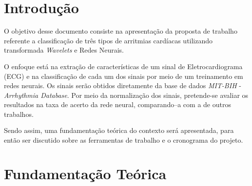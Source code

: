 \documentclass[conference]{IEEEtran}
\begin{document}




\maketitle






%
\IEEEpeerreviewmaketitle



\section{Introdução}
O objetivo desse documento consiste na apresentação da proposta de trabalho referente a classificação de três tipos de arritmias cardíacas utilizando transformada \textit{Wavelets} e Redes Neurais.

O enfoque está na extração de características de um sinal de Eletrocardiograma (ECG) e na classificação de cada um dos sinais por meio de um treinamento em redes neurais. Os sinais serão obtidos diretamente da base de dados \textit{MIT-BIH} - \textit{Arrhythmia Database}. Por meio da normalização dos sinais, pretende-se avaliar os resultados na taxa de acerto da rede neural, comparando–a com a de outros trabalhos.

Sendo assim, uma fundamentação teórica do contexto será apresentada, para então ser discutido sobre as ferramentas de trabalho e o cronograma do projeto.

 

\section{Fundamentação Teórica}
\end{document}
